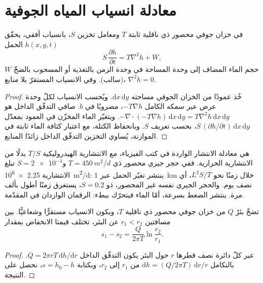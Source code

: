 \section{معادلة انسياب المياه الجوفية}\label{sec:b3:hydrogeology:flow-equation}

\begin{theorem}\label{thm:b3:hydrogeology:flow-equation}
في خزان جوفي محصور ذي ناقلية ثابتة $T$ ومعامل تخزين $S$،
بانسياب أفقي، يحقّق الحمل $h(x, y, t)$
\[
S\,\frac{\partial h}{\partial t} = T\nabla^2h + W ,
\]
$W$ حجم الماء المضاف إلى وحدة المساحة في وحدة الزمن بالتغذية أو
المسحوب بالضخّ (سالب). وفي الانسياب المستقرّ بلا منابع، $\nabla^2h =
0$.
\end{theorem}

\begin{proof}
خُذ عمودًا من الخزان الجوفي مساحته $\mathrm dx\,\mathrm dy$. ويُحسب الانسياب لكلّ
وحدة عرض عبر سمكه الكامل $-T\nabla h$، 
مضروبًا في $b$. صافي التدفّق الداخل هو $-\nabla\cdot(-T\nabla h)\,\mathrm dx\,\mathrm
dy = T\nabla^2h\,\mathrm dx\,\mathrm dy$. ويتغيّر الماء المخزّن في العمود
بمعدّل $S\,(\partial h/\partial t)\,\mathrm dx\,\mathrm dy$،
بحسب تعريف $S$. وبانحفاظ الكتلة، مع اعتبار كثافة الماء ثابتة في الموازنة،
يُساوي التخزين التدفّق الداخل زائدًا المنابع.
\end{proof}

هي معادلة الانتشار الواردة في كتب الفيزياء، مع الانتشارية الهيدروليكية
$T/S$ بدلًا من الانتشارية الحرارية. ففي حجر جيري محصور ذي
$T = \qty{450}{m^2/d}$ و$S = \num{2e-4}$ تبلغ الانتشارية
\qty{2.25e6}{m^2/d}: ينتشر تغيّر الحمل عبر \qty{1}{km} خلال
زمنًا نحو $L^2S/T$، أي نصف يوم. والحجر الجيري نفسه غير المحصور، ذو $S =
0.2$، يستغرق زمنًا أطول بألف مرة. ينتشر الضغط بسرعة، أمّا
الماء فيتحرّك ببطء: الرقمان الواردان في المقدّمة.

\begin{proposition}\label{prop:b3:hydrogeology:thiem}
تضخّ بئرٌ $Q$ من خزان جوفي محصور ذي ناقلية $T$، ويكون الانسياب
مستقرًّا وشعاعيًّا. بين مسافتين $r_1 < r_2$ عن البئر،
تختلف قيمتا الانخفاض بمقدار
\[
s_1 - s_2 = \frac{Q}{2\pi T}\ln\frac{r_2}{r_1} .
\]
\end{proposition}

\begin{proof}
عبر كلّ دائرة نصف قطرها $r$ حول البئر يكون التدفّق الداخل $Q = 2\pi r
T\,\mathrm dh/\mathrm dr$. بالتكامل $\mathrm dh = (Q/2\pi T)\,\mathrm
dr/r$ من $r_1$ إلى $r_2$، وبكتابة $s = h_0 - h$، نحصل على النتيجة.
\end{proof}

